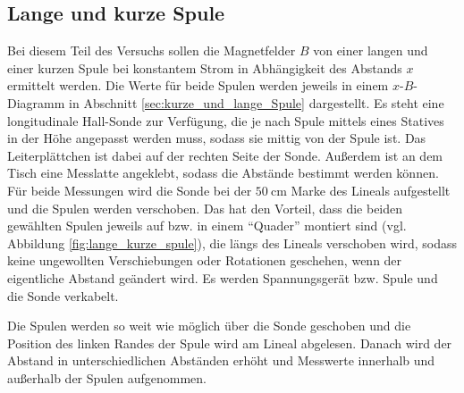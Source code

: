 \subsection{Lange und kurze Spule}
\label{sec:durchführung_kurze_lange_spule}
Bei diesem Teil des Versuchs sollen die Magnetfelder $B$ von einer langen und einer kurzen Spule bei konstantem Strom in Abhängigkeit 
des Abstands $x$ ermittelt werden.
Die Werte für beide Spulen werden jeweils in einem $x$-$B$-Diagramm in Abschnitt \ref{sec:kurze_und_lange_Spule} dargestellt.
Es steht eine longitudinale Hall-Sonde zur Verfügung, die je nach Spule mittels eines Statives in der Höhe angepasst werden muss, 
sodass sie mittig von der Spule ist.
Das Leiterplättchen ist dabei auf der rechten Seite der Sonde.
Außerdem ist an dem Tisch eine Messlatte angeklebt, sodass die Abstände bestimmt werden können.
Für beide Messungen wird die Sonde bei der $\qty{50}{\cm}$ Marke des Lineals aufgestellt und die Spulen werden verschoben.
Das hat den Vorteil, dass die beiden gewählten Spulen jeweils auf bzw. in einem \enquote{Quader} montiert sind (vgl. Abbildung \ref{fig:lange_kurze_spule}), 
die längs des Lineals verschoben wird,  sodass keine ungewollten Verschiebungen oder Rotationen geschehen, wenn der eigentliche Abstand geändert wird.
Es werden Spannungsgerät bzw. Spule und die Sonde verkabelt.

\noindent
Die Spulen werden so weit wie möglich über die Sonde geschoben und die Position des linken Randes der Spule wird am Lineal abgelesen.
Danach wird der Abstand in unterschiedlichen Abständen erhöht und Messwerte innerhalb und außerhalb der Spulen aufgenommen.


